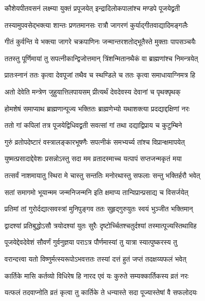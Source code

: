 \twolineshloka
{कौशेयपीतवसनं लक्ष्म्या युक्तं प्रपूजयेत्}
{इन्द्रादिलोकपालांश्च मण्डपे पूजयेद्व्रती} %

\twolineshloka
{तस्यामुपवसेद्भक्त्या शान्तः प्रणतमानसः}
{रात्रौ जागरणं कुर्याद्गीतवाद्यादिमङ्गलैः} %

\twolineshloka
{गीतं कुर्वन्ति ये भक्त्या जागरे चक्रपाणिनः}
{जन्मान्तरशतोद्भूतैस्ते मुक्ताः पापसञ्चयैः} %

\twolineshloka
{ततस्तु पूर्णिमायां तु सपत्नीकान्द्विजोत्तमान्}
{त्रिंशन्मितानथैकं वा ब्राह्मणांश्च निमन्त्रयेत्} %

\twolineshloka
{प्रातःस्नानं ततः कृत्वा देवपूजां तथैव च}
{स्थण्डिले च ततः कृत्वा समाधायाग्निमत्र हि} %

\twolineshloka
{अतो देवेति मन्त्रेण जुहुयात्तिलपायसम्}
{प्रीत्यर्थं देवदेवस्य देवानां च पृथक्पृथक्} %

\twolineshloka
{होमशेषं समाप्याथ ब्राह्मणान्पूज्य भक्तितः}
{ब्राह्मणेभ्यो यथाशक्त्या प्रदद्याद्दक्षिणां नरः} %

\twolineshloka
{ततो गां कपिलां तत्र पूजयेद्विधिवद्व्रती}
{सवत्सां गां तथा दद्याद्विप्राय च कुटुम्बिने} %

\twolineshloka
{गुरुं व्रतोपदेष्टारं वस्त्रालङ्कारभूषणैः}
{सपत्नीकं समभ्यर्च्य तांश्च विप्रान्क्षमापयेत्} %

\twolineshloka
{युष्मत्प्रसादाद्देवेशः प्रसन्नोऽस्तु सदा मम}
{व्रतादस्माच्च यत्पापं सप्तजन्मकृतं मया} %

\twolineshloka
{तत्सर्वं नाशमायातु स्थिरा मे चास्तु सन्ततिः}
{मनोरथास्तु सफलाः सन्तु भक्तिर्हरौ भवेत्} %

\twolineshloka
{सतां समागमो भूयान्मम जन्मनिजन्मनि}
{इति क्षमाप्य तान्विप्रान्प्रसाद्य च विसर्जयेत्} %

\twolineshloka
{प्रतिमां तां गुरोर्दद्यात्सवस्त्रां मुनिपुङ्गव}
{ततः सुहृद्गुरुयुतः स्वयं भुञ्जीत भक्तिमान्} %

\twolineshloka
{द्वादश्यां प्रतिबुद्धोऽसौ त्रयोदश्यां युतः सुरैः}
{दृष्टोर्च्चितश्चतुर्दश्यां तस्मात्पूज्यस्तिथाविह} %

\twolineshloka
{पूजयेद्देवदेवेशं सौवर्णं गुर्वनुज्ञया}
{पराऽत्र पौर्णमास्यां तु यात्रा स्यात्पुष्करस्य तु} %

\twolineshloka
{वरान्दत्त्वा यतो विष्णुर्मत्स्यरूपोऽभवत्ततः}
{तस्यां दत्तं हुतं जप्तं तदक्षय्यफलं भवेत्} %

\twolineshloka
{कार्तिके मासि कर्तव्यो विधिरेष हि नारद}
{एवं यः कुरुते सम्यक्कार्तिकस्य व्रतं नरः} %

\twolineshloka
{यत्फलं तदवाप्नोति व्रतं कृत्वा तु कार्तिके}
{ते धन्यास्ते सदा पूज्यास्तेषां वै सफलोदयः} %

